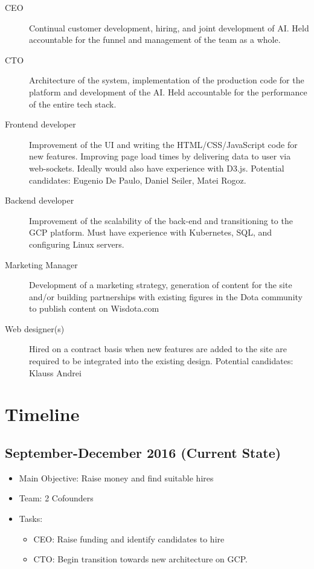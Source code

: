 \documentclass[12pt]{article} %
\let\oldsection\section
\renewcommand\section{\clearpage\oldsection}
\begin{document}
\begin{description}
    \item [CEO] Continual customer development, hiring, and joint development of AI. Held accountable for the funnel and management of the team as a whole.
    \item [CTO] Architecture of the system, implementation of the production code for the platform and development of the AI. Held accountable for the performance of the entire tech stack.
    \vspace{0.5cm}
    \item [Frontend developer] Improvement of the UI and writing the HTML/CSS/JavaScript code for new features. Improving page load times by delivering data to user via web-sockets. Ideally would also have experience with D3.js. Potential candidates: Eugenio De Paulo, Daniel Seiler, Matei Rogoz.
    \item [Backend developer]  Improvement of the scalability of the back-end and transitioning to the GCP platform. Must have experience with Kubernetes, SQL, and configuring Linux servers.

    \item [Marketing Manager] Development of a marketing strategy, generation of content for the site and/or building partnerships with existing figures in the Dota community to publish content on Wisdota.com
    \item [Web designer(s)] Hired on a contract basis when new features are added to the site are required to be integrated into the existing design. Potential candidates: Klauss Andrei
\end{description}

\section{Timeline}

\subsection[Sep.-Dec. 2016 (Current State)]{September-December 2016 (Current State)}
\begin{itemize}
\item Main Objective: Raise money and find suitable hires
\item Team: 2 Cofounders 
\item Tasks:
\begin{itemize}
\item CEO: Raise funding and identify candidates to hire 
\item CTO: Begin transition towards new architecture on GCP.
\end{itemize}
\end{itemize}
\end{document}
